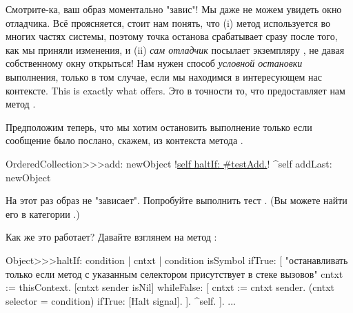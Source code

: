 \documentclass[a4paper,10pt,twoside]{book}
\begin{document}
Смотрите-ка, ваш образ моментально "завис"! Мы даже не можем увидеть окно отладчика.
Всё проясняется, стоит нам понять, что (i) метод  используется во многих частях системы, поэтому точка останова срабатывает сразу после того, как мы приняли изменения, и  (ii) \emph{сам отладчик} посылает  экземпляру , не давая собственному окну открыться!
Нам нужен способ \emph{условной остановки} выполнения, только в том случае, если мы находимся в интересующем нас контексте.
This is exactly what  offers.
Это в точности то, что предоставляет нам метод .

Предположим теперь, что мы хотим остановить выполнение только если сообщение  было послано, скажем, из контекста метода .

\begin{code}{}
OrderedCollection>>>add: newObject
	!\underline{self haltIf: \#testAdd.}!
	^self addLast: newObject
\end{code}

На этот раз образ не "зависает". Попробуйте выполнить тест .
(Вы можете найти его в категории .)

Как же это работает? Давайте взглянем на метод :
\begin{code}{}
Object>>>haltIf: condition
	| cntxt |
	condition isSymbol ifTrue: [
		"останавливать только если метод с указанным селектором присутствует в стеке вызовов"
		cntxt := thisContext.
		[cntxt sender isNil] whileFalse: [
			cntxt := cntxt sender. 
			(cntxt selector = condition) ifTrue: [Halt signal]. ].
		^self.
	].
	...
\end{code}
\end{document}
